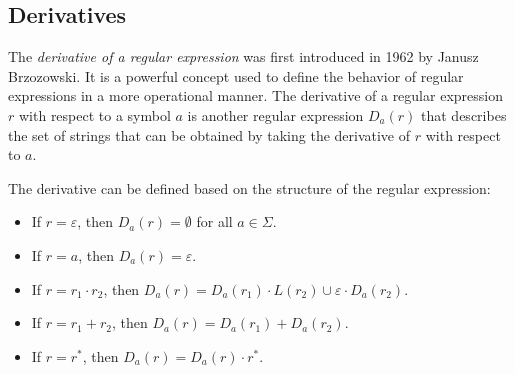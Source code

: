 \subsection{Derivatives}
The \emph{derivative of a regular expression} was first introduced in 1962 by Janusz Brzozowski. It is a powerful concept used to define the behavior of regular expressions in a more operational manner. The derivative of a regular expression $r$ with respect to a symbol $a$ is another regular expression $D_a(r)$ that describes the set of strings that can be obtained by taking the derivative of $r$ with respect to $a$.

The derivative can be defined based on the structure of the regular expression:

\begin{itemize}
    \item If $r = \varepsilon$, then $D_a(r) = \emptyset$ for all $a \in \Sigma$.
    \item If $r = a$, then $D_a(r) = \varepsilon$.
    \item If $r = r_1 \cdot r_2$, then $D_a(r) = D_a(r_1) \cdot L(r_2) \cup \varepsilon \cdot D_a(r_2)$.
    \item If $r = r_1 + r_2$, then $D_a(r) = D_a(r_1) + D_a(r_2)$.
    \item If $r = r^*$, then $D_a(r) = D_a(r) \cdot r^*$.
\end{itemize}